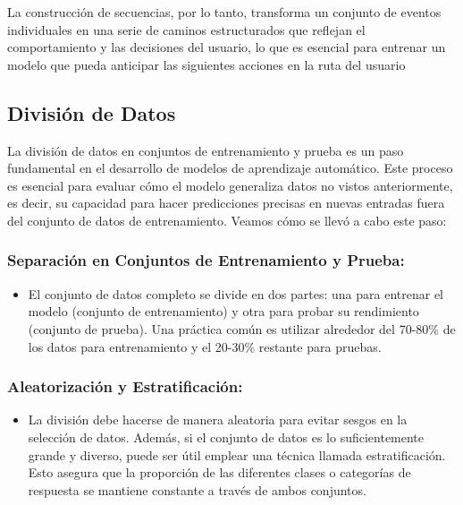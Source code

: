 La construcción de secuencias, por lo tanto, transforma un conjunto de eventos individuales en una serie de caminos estructurados que reflejan el comportamiento y las decisiones del usuario, lo que es esencial para entrenar un modelo que pueda anticipar las siguientes acciones en la ruta del usuario

\subsection{División de Datos}

La división de datos en conjuntos de entrenamiento y prueba es un paso fundamental en el desarrollo de modelos de aprendizaje automático. Este proceso es esencial para evaluar cómo el modelo generaliza datos no vistos anteriormente, es decir, su capacidad para hacer predicciones precisas en nuevas entradas fuera del conjunto de datos de entrenamiento. Veamos cómo se llevó a cabo este paso:

\subsubsection{Separación en Conjuntos de Entrenamiento y Prueba:}

\begin{itemize}
    \item El conjunto de datos completo se divide en dos partes: una para entrenar el modelo (conjunto de entrenamiento) y otra para probar su rendimiento (conjunto de prueba). Una práctica común es utilizar alrededor del 70-80\% de los datos para entrenamiento y el 20-30\% restante para pruebas.
\end{itemize}

\subsubsection{Aleatorización y Estratificación:}

\begin{itemize}
    \item La división debe hacerse de manera aleatoria para evitar sesgos en la selección de datos. Además, si el conjunto de datos es lo suficientemente grande y diverso, puede ser útil emplear una técnica llamada estratificación. Esto asegura que la proporción de las diferentes clases o categorías de respuesta se mantiene constante a través de ambos conjuntos.
\end{itemize}


